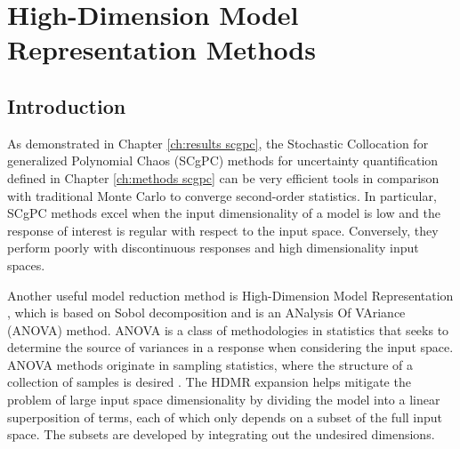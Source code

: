
\chapter{High-Dimension Model Representation Methods} %

\label{ch:methods hdmr} %



\section{Introduction}\label{sec:hdmr intro}
As demonstrated in Chapter \ref{ch:results scgpc}, the Stochastic Collocation for generalized Polynomial Chaos
(SCgPC) methods for uncertainty quantification defined in Chapter \ref{ch:methods scgpc} can be very efficient
tools in comparison with traditional Monte Carlo to converge second-order statistics.  In particular, SCgPC
methods excel when the input dimensionality of a model is low and the response of interest is regular with respect
to the input space.  Conversely, they perform poorly with discontinuous responses and high dimensionality
input spaces.

Another useful model reduction method is High-Dimension Model Representation \cite{hdmr}, 
which is based on Sobol decomposition and is an ANalysis Of VAriance (ANOVA) method.  
ANOVA is a class of methodologies in statistics that seeks to determine the source of variances in a response
when considering the input space.  ANOVA methods originate in sampling statistics, where the structure of a
collection of samples is desired \cite{anova}.
The HDMR expansion helps
mitigate the problem of large input space dimensionality by dividing the model into a linear superposition of terms, 
each of which only depends on a subset of
the full input space.  The subsets are developed by integrating out the undesired dimensions.


